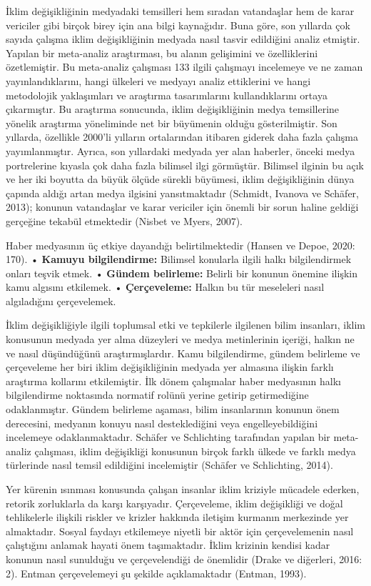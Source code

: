 \documentclass[
]{book}
\begin{document}
İklim değişikliğinin medyadaki temsilleri hem sıradan vatandaşlar hem de karar vericiler gibi birçok birey için ana bilgi kaynağıdır. Buna göre, son yıllarda çok sayıda çalışma iklim değişikliğinin medyada nasıl tasvir edildiğini analiz etmiştir. Yapılan bir meta-analiz araştırması, bu alanın gelişimini ve özelliklerini özetlemiştir. Bu meta-analiz çalışması 133 ilgili çalışmayı incelemeye ve ne zaman yayınlandıklarını, hangi ülkeleri ve medyayı analiz ettiklerini ve hangi metodolojik yaklaşımları ve araştırma tasarımlarını kullandıklarını ortaya çıkarmıştır. Bu araştırma sonucunda, iklim değişikliğinin medya temsillerine yönelik araştırma yöneliminde net bir büyümenin olduğu gösterilmiştir. Son yıllarda, özellikle 2000'li yılların ortalarından itibaren giderek daha fazla çalışma yayımlanmıştır. Ayrıca, son yıllardaki medyada yer alan haberler, önceki medya portrelerine kıyasla çok daha fazla bilimsel ilgi görmüştür. Bilimsel ilginin bu açık ve her iki boyutta da büyük ölçüde sürekli büyümesi, iklim değişikliğinin dünya çapında aldığı artan medya ilgisini yansıtmaktadır (Schmidt, Ivanova ve Schäfer, 2013); konunun vatandaşlar ve karar vericiler için önemli bir sorun haline geldiği gerçeğine tekabül etmektedir (Nisbet ve Myers, 2007).

Haber medyasının üç etkiye dayandığı belirtilmektedir (Hansen ve Depoe, 2020: 170).
• \textbf{Kamuyu bilgilendirme:} Bilimsel konularla ilgili halkı bilgilendirmek onları teşvik etmek.
• \textbf{Gündem belirleme:} Belirli bir konunun önemine ilişkin kamu algısını etkilemek.
• \textbf{Çerçeveleme:} Halkın bu tür meseleleri nasıl algıladığını çerçevelemek.

İklim değişikliğiyle ilgili toplumsal etki ve tepkilerle ilgilenen bilim insanları, iklim konusunun medyada yer alma düzeyleri ve medya metinlerinin içeriği, halkın ne ve nasıl düşündüğünü araştırmışlardır. Kamu bilgilendirme, gündem belirleme ve çerçeveleme her biri iklim değişikliğinin medyada yer almasına ilişkin farklı araştırma kollarını etkilemiştir. İlk dönem çalışmalar haber medyasının halkı bilgilendirme noktasında normatif rolünü yerine getirip getirmediğine odaklanmıştır.
Gündem belirleme aşaması, bilim insanlarının konunun önem derecesini, medyanın konuyu nasıl desteklediğini veya engelleyebildiğini incelemeye odaklanmaktadır. Schäfer ve Schlichting tarafından yapılan bir meta-analiz çalışması, iklim değişikliği konusunun birçok farklı ülkede ve farklı medya türlerinde nasıl temsil edildiğini incelemiştir (Schäfer ve Schlichting, 2014).

Yer kürenin ısınması konusunda çalışan insanlar iklim kriziyle mücadele ederken, retorik zorluklarla da karşı karşıyadır. Çerçeveleme, iklim değişikliği ve doğal tehlikelerle ilişkili riskler ve krizler hakkında iletişim kurmanın merkezinde yer almaktadır. Sosyal faydayı etkilemeye niyetli bir aktör için çerçevelemenin nasıl çalıştığını anlamak hayati önem taşımaktadır. İklim krizinin kendisi kadar konunun nasıl sunulduğu ve çerçevelendiği de önemlidir (Drake ve diğerleri, 2016: 2). Entman çerçevelemeyi şu şekilde açıklamaktadır (Entman, 1993).
\end{document}
